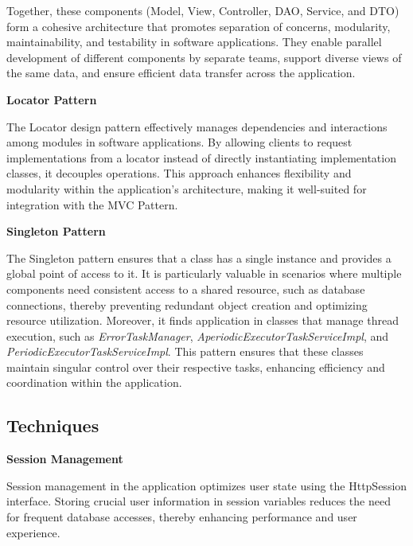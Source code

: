 \vspace{\baselineskip}

Together, these components (Model, View, Controller, DAO, Service, and DTO) form a cohesive architecture that promotes 
separation of concerns, modularity, maintainability, and testability in software applications. They enable parallel 
development of different components by separate teams, support diverse views of the same data, and ensure efficient data 
transfer across the application.

\vspace{\baselineskip}

\textbf{Locator Pattern}

The Locator design pattern effectively manages dependencies and interactions among modules in software applications.
By allowing clients to request implementations from a locator instead of directly instantiating implementation 
classes, it decouples operations. This approach enhances flexibility and modularity within the application's 
architecture, making it well-suited for integration with the MVC Pattern.

\newpage

\textbf{Singleton Pattern}

The Singleton pattern ensures that a class has a single instance and provides a global point of access to it. It is 
particularly valuable in scenarios where multiple components need consistent access to a shared resource, such as 
database connections, thereby preventing redundant object creation and optimizing resource utilization. Moreover, 
it finds application in classes that manage thread execution, such as \textit{ErrorTaskManager}, 
\textit{AperiodicExecutorTaskServiceImpl}, and \textit{PeriodicExecutorTaskServiceImpl}. This pattern ensures that 
these classes maintain singular control over their respective tasks, enhancing efficiency and coordination within the application.

\subsection*{Techniques}

\textbf{Session Management}

Session management in the application optimizes user state using the HttpSession interface. Storing crucial user information in session variables 
reduces the need for frequent database accesses, thereby enhancing performance and user experience.

\vspace{\baselineskip}

